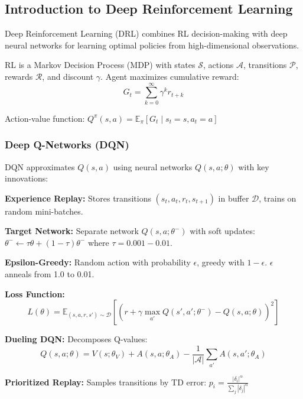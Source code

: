 \documentclass[12pt,a4paper]{article}
\begin{document}
\subsection{Introduction to Deep Reinforcement Learning}

Deep Reinforcement Learning (DRL) combines RL decision-making with deep neural networks for learning optimal policies from high-dimensional observations.

RL is a Markov Decision Process (MDP) with states $\mathcal{S}$, actions $\mathcal{A}$, transitions $\mathcal{P}$, rewards $\mathcal{R}$, and discount $\gamma$. Agent maximizes cumulative reward:
\begin{equation}
G_t = \sum_{k=0}^{\infty} \gamma^k r_{t+k}
\end{equation}

Action-value function: $Q^\pi(s,a) = \mathbb{E}_\pi[ G_t \mid s_t = s, a_t = a ]$

\subsubsection{Deep Q-Networks (DQN)}

DQN approximates $Q(s,a)$ using neural networks $Q(s,a;\theta)$ with key innovations:

\textbf{Experience Replay:} Stores transitions $(s_t, a_t, r_t, s_{t+1})$ in buffer $\mathcal{D}$, trains on random mini-batches.

\textbf{Target Network:} Separate network $Q(s,a;\theta^-)$ with soft updates: $\theta^- \leftarrow \tau \theta + (1-\tau) \theta^-$ where $\tau = 0.001-0.01$.

\textbf{Epsilon-Greedy:} Random action with probability $\epsilon$, greedy with $1-\epsilon$. $\epsilon$ anneals from 1.0 to 0.01.

\textbf{Loss Function:}
\begin{equation}
L(\theta) = \mathbb{E}_{(s,a,r,s') \sim \mathcal{D}} \left[ \left( r + \gamma \max_{a'} Q(s',a';\theta^-) - Q(s,a;\theta) \right)^2 \right]
\end{equation}

\textbf{Dueling DQN:} Decomposes Q-values:
\begin{equation}
Q(s,a;\theta) = V(s;\theta_V) + A(s,a;\theta_A) - \frac{1}{|\mathcal{A}|}\sum_{a'} A(s,a';\theta_A)
\end{equation}

\textbf{Prioritized Replay:} Samples transitions by TD error: $p_i = \frac{|\delta_i|^\alpha}{\sum_j |\delta_j|^\alpha}$
\end{document}

